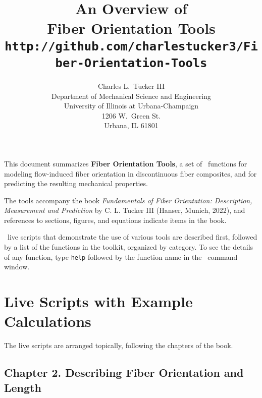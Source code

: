 \documentclass[11pt]{article}
\title{An Overview of \\
      \textbf{Fiber Orientation Tools} \\
      { \normalsize \texttt{http://github.com/charlestucker3/Fiber-Orientation-Tools}} }
\author{Charles L.~Tucker III \\
       Department of Mechanical Science and Engineering \\
        University of Illinois at Urbana-Champaign \\
        1206 W.~Green St. \\
        Urbana, IL 61801 \\
        }
\begin{document}
\maketitle

This document summarizes \textbf{Fiber Orientation Tools}, a set of \matlab\ functions for modeling flow-induced fiber orientation in discontinuous fiber composites, and for predicting the resulting mechanical properties.  

The tools accompany the book \textit{Fundamentals of Fiber Orientation: Description, Measurement and Prediction} by C. L. Tucker III (Hanser, Munich, 2022), and references to sections, figures, and equations indicate items in the book.  

 \matlab\ live scripts that demonstrate the use of various tools are described first, followed by a list of the functions in the toolkit, organized by category.  To see the details of any function, type \texttt{help} followed by the function name in the \matlab\ command window.



\section{Live Scripts with Example Calculations}

The live scripts are arranged topically, following the chapters of the book.  

\subsection*{Chapter 2.  Describing Fiber Orientation and Length}
\end{document}
